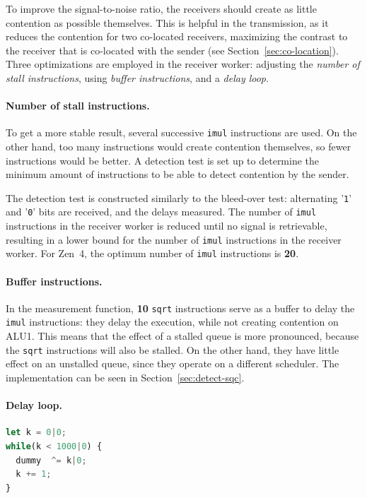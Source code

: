 \documentclass[11pt,
  titlepage=false,
  parskip=half,      %
]{scrreprt}
\begin{document}
To improve the signal-to-noise ratio, the receivers should create as little contention as possible themselves.
This is helpful in the transmission, as it reduces the contention for two co-located receivers,
maximizing the contrast to the receiver that is co-located with the sender (see Section~\ref{sec:co-location}).
Three optimizations are employed in the receiver worker: adjusting the \textit{number of stall instructions},
using \textit{buffer instructions}, and a \textit{delay loop}.

\paragraph{Number of stall instructions.}
To get a more stable result, several successive \texttt{imul} instructions are used.
On the other hand, too many instructions would create contention themselves, so fewer instructions would be better.
A detection test is set up to determine the minimum amount of instructions to be able to detect contention by the sender.

The detection test is constructed similarly to the bleed-over test:
alternating '\texttt{1}' and '\texttt{0}' bits are received, and the delays measured.
The number of \texttt{imul} instructions in the receiver worker is reduced until no signal is retrievable,
resulting in a lower bound for the number of \texttt{imul} instructions in the receiver worker.
For Zen~4, the optimum number of \texttt{imul} instructions is \textbf{20}.

\paragraph{Buffer instructions.}
In the measurement function, \textbf{10} \texttt{sqrt} instructions serve as a buffer to delay the \texttt{imul} instructions:
they delay the execution, while not creating contention on ALU1.
This means that the effect of a stalled queue is more pronounced, because the \texttt{sqrt} instructions will also be stalled.
On the other hand, they have little effect on an unstalled queue, since they operate on a different scheduler.
The implementation can be seen in Section~\ref{sec:detect-sqc}.

\paragraph{Delay loop.}
\begin{lstlisting}[float,caption={The delay loop after a measurement},label={lst:delayloop},language=JavaScript]
let k = 0|0;
while(k < 1000|0) {
  dummy  ^= k|0;
  k += 1;
}
\end{lstlisting}
\end{document}
